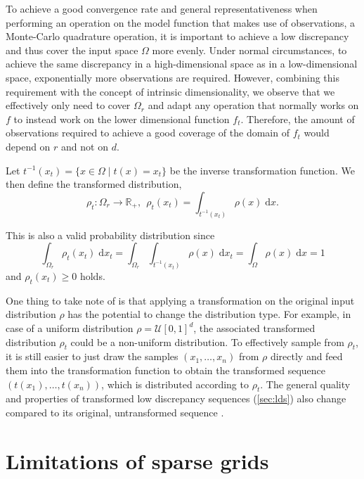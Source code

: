 \documentclass[
  a4paper,  %
  twoside,  %
  bibliography=totoc,
  headsepline,
  cleardoublepage=empty,
  parskip=half,
  draft=false
]{scrbook}
\begin{document}
To achieve a good convergence rate and general representativeness when performing an operation on the model function that makes use of observations, \eg a Monte-Carlo quadrature operation, it is important to achieve a low discrepancy and thus cover the input space $\Omega$ more evenly.
Under normal circumstances, to achieve the same discrepancy in a high-dimensional space as in a low-dimensional space,
exponentially more observations are required.
However, combining this requirement with the concept of intrinsic dimensionality, we observe that we effectively only need to cover $\Omega_r$ and adapt any operation that normally works on $f$ to instead work on the lower dimensional function $f_t$.
Therefore, the amount of observations required to achieve a good coverage of the domain of $f_t$ would depend on $r$ and not on $d$.

\begin{definition}
Let $t^{-1}(x_{t})=\{x \in \Omega \mid t(x)=x_{t}\}$ be the inverse transformation function.
We then define the transformed distribution,
\begin{equation}
\rho_t \colon \Omega_r \to \mathds{R_+}, ~~ \rho_t(x_t)=\int_{t^{-1}(x_t)} \rho(x) \; \mathrm{d}x.
\end{equation}
\end{definition}
This is also a valid probability distribution since
\begin{equation}
\int_{\Omega_r} \rho_t(x_t) \; \mathrm{d}x_t=\int_{\Omega_r} \int_{t^{-1}(x_t)} \rho(x) \; \mathrm{d}x_t = \int_{\Omega} \rho(x) \; \mathrm{d}x = 1
\end{equation}
and $\rho_t(x_t) \geq 0$ holds.

One thing to take note of is that applying a transformation on the original input distribution $\rho$ has the potential to change the distribution type.
For example, in case of a uniform distribution $\rho=\mathcal{U}[0,1]^d$, the associated transformed distribution $\rho_t$ could be a non-uniform distribution.
To effectively sample from $\rho_t$, it is still easier to just draw the samples $(x_1, \dots, x_n)$ from $\rho$ directly and feed them into the transformation function to obtain the transformed sequence $(t(x_1), \dots, t(x_n))$, which is distributed according to $\rho_t$.
The general quality and properties of transformed low discrepancy sequences (\cref{sec:lds}) also change compared to its original, untransformed sequence \cite{Wang2008}.

\section{Limitations of sparse grids}
\end{document}
